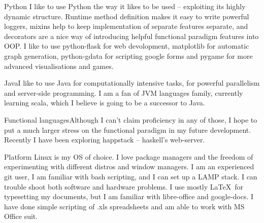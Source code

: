 \documentclass{tccv}
\begin{document}
\begin{skillist}

\item{Python}
     {I like to use Python the way it likes to be used -- exploiting its highly dynamic structure. Runtime method definition makes it easy to write powerful loggers, mixins help to keep implementation of separate features separate, and decorators are a nice way of introducing helpful functional paradigm features into OOP. I like to use python-flask for web devolopment, matplotlib for automatic graph generation, python-gdata for scripting google forms and pygame for more advanced visualisations and games.}
\item{Java}{I like to use Java for computationally intensive tasks, for powerful parallelism and server-side programming. I am a fan of JVM languages family, currently learning scala, which I believe is going to be a successor to Java.}
\item{Functional languages}{Although I can't claim proficiency in any of those, I hope to put a much larger stress on the functional paradigm in my future development. Recently I have been exploring happstack -- haskell's web-server.}
\item{Platform}
     {Linux is my OS of choice. I love package managers and the freedom of experimenting with different distros and window managers. I am an experienced git user, I am familiar with bash scripting, and I can set up a LAMP stack. I can trouble shoot both software and hardware problems. I use mostly \LaTeX \ for typesetting my documents, but I am familiar with libre-office and google-docs. I have done simple scripting of .xls spreadsheets and am able to work with MS Office suit.}
\end{skillist}
\end{document}
